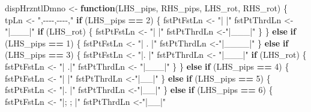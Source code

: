 \documentclass[
]{article}
\newenvironment{Shaded}{\begin{snugshade}}{\end{snugshade}}
\newcommand{\ControlFlowTok}[1]{\textcolor[rgb]{0.13,0.29,0.53}{\textbf{#1}}}
\newcommand{\DecValTok}[1]{\textcolor[rgb]{0.00,0.00,0.81}{#1}}
\newcommand{\NormalTok}[1]{#1}
\newcommand{\OtherTok}[1]{\textcolor[rgb]{0.56,0.35,0.01}{#1}}
\newcommand{\SpecialCharTok}[1]{\textcolor[rgb]{0.81,0.36,0.00}{\textbf{#1}}}
\newcommand{\StringTok}[1]{\textcolor[rgb]{0.31,0.60,0.02}{#1}}
\begin{document}
\begin{Shaded}
\begin{Highlighting}[]
\NormalTok{dispHrzntlDmno }\OtherTok{\textless{}{-}} \ControlFlowTok{function}\NormalTok{(LHS\_pips, RHS\_pips, LHS\_rot, RHS\_rot) \{}
\NormalTok{  tpLn }\OtherTok{\textless{}{-}} \StringTok{",{-}{-}{-}{-},{-}{-}{-}{-},"}
  \ControlFlowTok{if}\NormalTok{ (LHS\_pips }\SpecialCharTok{==} \DecValTok{2}\NormalTok{) \{}
\NormalTok{    fstPtFstLn }\OtherTok{\textless{}{-}}  \StringTok{"|\textquotesingle{}   |"}
\NormalTok{    fstPtThrdLn }\OtherTok{\textless{}{-}} \StringTok{"|\_\_\textquotesingle{}\_|"}
    \ControlFlowTok{if}\NormalTok{ (LHS\_rot) \{}
\NormalTok{      fstPtFstLn }\OtherTok{\textless{}{-}} \StringTok{"|   \textquotesingle{}|"}
\NormalTok{      fstPtThrdLn }\OtherTok{\textless{}{-}}\StringTok{"|\_\textquotesingle{}\_\_|"}
\NormalTok{    \}}
\NormalTok{  \} }\ControlFlowTok{else} \ControlFlowTok{if}\NormalTok{ (LHS\_pips }\SpecialCharTok{==} \DecValTok{1}\NormalTok{) \{}
\NormalTok{    fstPtFstLn }\OtherTok{\textless{}{-}} \StringTok{"|  . |"}
\NormalTok{    fstPtThrdLn }\OtherTok{\textless{}{-}}\StringTok{"|\_\_\_\_|"}
\NormalTok{  \} }\ControlFlowTok{else} \ControlFlowTok{if}\NormalTok{ (LHS\_pips }\SpecialCharTok{==} \DecValTok{3}\NormalTok{) \{}
\NormalTok{    fstPtFstLn }\OtherTok{\textless{}{-}}  \StringTok{"|\textquotesingle{}.  |"}
\NormalTok{    fstPtThrdLn }\OtherTok{\textless{}{-}} \StringTok{"|\_\_\textquotesingle{}\_|"}
    \ControlFlowTok{if}\NormalTok{ (LHS\_rot) \{}
\NormalTok{      fstPtFstLn }\OtherTok{\textless{}{-}}  \StringTok{"|  .\textquotesingle{}|"}
\NormalTok{      fstPtThrdLn }\OtherTok{\textless{}{-}} \StringTok{"|\_\textquotesingle{}\_\_|"}
\NormalTok{    \}}
\NormalTok{  \} }\ControlFlowTok{else} \ControlFlowTok{if}\NormalTok{ (LHS\_pips }\SpecialCharTok{==} \DecValTok{4}\NormalTok{) \{}
\NormalTok{    fstPtFstLn }\OtherTok{\textless{}{-}} \StringTok{"|\textquotesingle{} \textquotesingle{} |"}
\NormalTok{    fstPtThrdLn }\OtherTok{\textless{}{-}}\StringTok{"|\textquotesingle{}\_\textquotesingle{}\_|"}
\NormalTok{  \} }\ControlFlowTok{else} \ControlFlowTok{if}\NormalTok{ (LHS\_pips }\SpecialCharTok{==} \DecValTok{5}\NormalTok{) \{}
\NormalTok{    fstPtFstLn }\OtherTok{\textless{}{-}} \StringTok{"|\textquotesingle{}.\textquotesingle{} |"}
\NormalTok{    fstPtThrdLn }\OtherTok{\textless{}{-}}\StringTok{"|\textquotesingle{}\_\textquotesingle{}\_|"}
\NormalTok{  \} }\ControlFlowTok{else} \ControlFlowTok{if}\NormalTok{ (LHS\_pips }\SpecialCharTok{==} \DecValTok{6}\NormalTok{) \{}
\NormalTok{    fstPtFstLn }\OtherTok{\textless{}{-}} \StringTok{"|; ; |"}
\NormalTok{    fstPtThrdLn }\OtherTok{\textless{}{-}}\StringTok{"|\textasciigrave{}\_\textasciigrave{}\_|"}

\end{Highlighting}
\end{Shaded}
\end{document}
